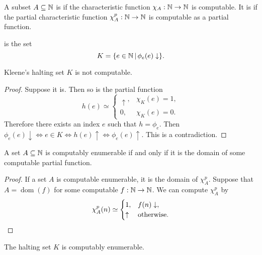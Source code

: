 
\begin{definition}
  A subset $A \subseteq \mathbb{N}$ is  if the characteristic function
  $\chi_A: \mathbb{N} \to \mathbb{N}$ is computable.
  It is  if the partial characteristic function
  $\chi_A^p: \mathbb{N} \to \mathbb{N}$ is computable as a partial function.
\end{definition}

\begin{definition}
   is the set
  \[
	K = \{e \in \mathbb{N} \,|\, \phi_e(e) \downarrow \}.
  \]
\end{definition}

\begin{proposition}
  Kleene's halting set $K$ is not computable.
\end{proposition}

\begin{proof}
  Suppose it is.
  Then so is the partial function
  \[
	h(e) \simeq
	\begin{cases}
	  \uparrow, & \chi_K(e) = 1, \\
	  0, & \chi_K(e) = 0.
	\end{cases}
  \]
  Therefore there exists an index $e$ such that $h = \phi_e$.
  Then $\phi_e(e) \downarrow \iff e \in K \iff h(e) \uparrow \iff \phi_e(e)
  \uparrow$.
  This is a contradiction.
\end{proof}

\begin{proposition}
  A set $A \subseteq \mathbb{N}$ is computably enumerable if and only if it is the
  domain of some computable partial function.
\end{proposition}

\begin{proof}
  If a set $A$ is computable enumerable, it is the domain of $\chi_A^p$.
  Suppose that $A = \operatorname{dom}(f)$ for some computable $f: \mathbb{N} \to \mathbb{N}$.
  We can compute $\chi_A^p$ by
  \[
	\chi_A^p(n) \simeq
	\begin{cases}
	  1, & f(n) \downarrow, \\
	  \uparrow & \text{otherwise.} \qedhere
	\end{cases}
  \]
\end{proof}

\begin{proposition}
  The halting set $K$ is computably enumerable.
\end{proposition}

